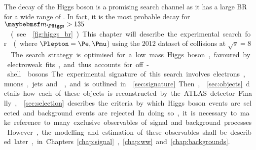 
The \WW decay of the Higgs boson is a promising search channel as it has a large \ac{BR} 
for a wide range of \mH. In fact, it is the most probable decay for 
\unit{$\mH > 135$}{\GeV} (see \Figure~\ref{fig:higgs_br}). This chapter will describe the 
experimental search for \ggHWWlvlv (where $\Plepton = \Pe, \Pmu$) using the 2012 dataset 
of \pp collisions at \unit{$\sqrt{s} = 8$}{\TeV}. The search strategy is optimised for a 
low mass Higgs boson, favoured by electroweak fits, and thus accounts for off-shell \PW 
bosons.

The experimental signature of this search involves electrons, muons, jets and \met, and is 
outlined in \Section~\ref{sec:signature}. Then, \Section~\ref{sec:objects} details how 
each of these objects is reconstructed by the ATLAS detector. Finally, 
\Section~\ref{sec:selection} describes the criteria by which Higgs boson events are 
selected and background events are rejected. In doing so, it is necessary to make 
reference to many exclusive observables of signal and background processes. However, 
the modelling and estimation of these observables shall be described later, in 
Chapters~\ref{chap:signal}, \ref{chap:ww} and \ref{chap:backgrounds}.
